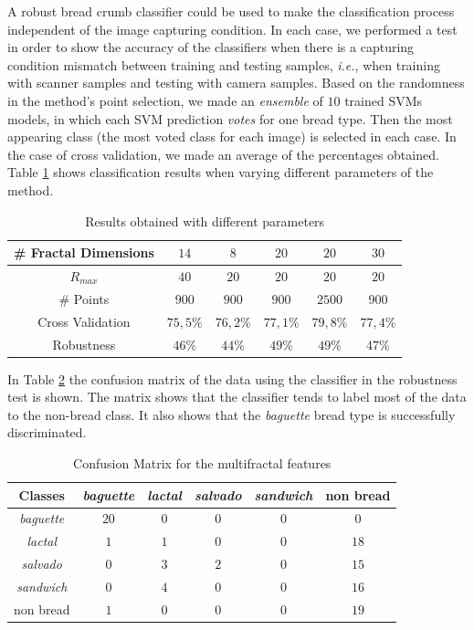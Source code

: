 \documentclass[oneside,a4paper,english,links]{article}
\begin{document}
A robust bread crumb classifier could be used to make the classification process independent of the image capturing condition. In each case, we performed a test in order to show the accuracy of the classifiers when there is a capturing condition mismatch between training and testing samples, {\em i.e.}, when training with scanner samples and testing with camera samples. Based on the randomness in the method's point selection, we made an {\em ensemble} of $10$ trained SVMs models, in which each SVM prediction {\em votes} for one bread type. Then the most appearing class (the most voted class for each image) is selected in each case. In the case of cross validation, we made an average of the percentages obtained. Table \ref{table:tableFirstTest} shows classification results when varying different parameters of the method.

\begin{table}[htb]
\centering
\begin{tabular}{|c|c|c|c|c|c|}
    \hline
    \# Fractal Dimensions & $14$ & $8$ & $20$ & $20$ & $30$\\
    \hline
    $R_{max}$ & $40$ & $20$ & $20$ & $20$ & $20$\\
    \hline
    \# Points & $900$ & $900$ & $900$ & $2500$ & $900$\\
    \hline
    Cross Validation  & $75,5\%$ & $76,2\%$ & $77,1\%$ & $79,8\%$ & $77,4\%$\\
    \hline
    Robustness & $46\%$ & $44\%$ & $49\%$ & $49\%$ & $47\%$ \\
    \hline
\end{tabular}
\caption{Results obtained with different parameters}
\label{table:tableFirstTest}
\end{table}


In Table \ref{table:ConfusionMatrixFractal} the confusion matrix of the data using the classifier in the robustness test is shown. The matrix shows that the classifier tends to label most of the data to the non-bread class. It also shows that the {\em baguette} bread type is successfully discriminated.
\begin{table}[htb]
\centering
\begin{tabular}{|c|c|c|c|c|c|}
    \hline
    Classes & {\em baguette} & {\em lactal} & {\em salvado} & {\em sandwich} & non bread\\
    \hline
    \hline
    {\em baguette}  & $20$ & $0$ & $0$ & $0$  & $0$\\
    \hline
    {\em lactal}    & $1$ & $1$ & $0$ & $0$  & $18$\\
    \hline
    {\em salvado}   & $0$ & $3$ & $2$ & $0$  & $15$\\
    \hline
    {\em sandwich}  & $0$ & $4$  & $0$ & $0$ & $16$\\
    \hline
    non bread       & $1$ & $0$  & $0$ & $0$  & $19$\\
    \hline
\end{tabular}
\caption{Confusion Matrix for the multifractal features}
\label{table:ConfusionMatrixFractal}
\end{table}
\end{document}
